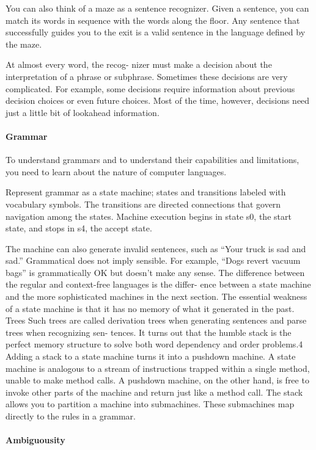 You can also think of a maze as a sentence recognizer. Given a sentence, you can match its words in sequence with the words along the floor. Any sentence that successfully guides you to the exit is a valid sentence in the language defined by the maze. 

At almost every word, the recog- nizer must make a decision about the interpretation of a phrase or subphrase. Sometimes these decisions are very complicated. For example, some decisions require information about previous decision choices or even future choices. Most of the time, however, decisions need just a little bit of lookahead information.

\paragraph{Grammar} To understand grammars and to understand their capabilities and limitations, you need to learn about the nature of computer languages.

Represent grammar as a state machine; states and transitions labeled with vocabulary symbols. The transitions are directed connections that govern navigation among the states. Machine execution begins in state s0, the start state, and stops in s4, the accept state.

The machine can also generate invalid sentences, such as “Your truck is sad and sad.” Grammatical does not imply sensible. For example, “Dogs revert vacuum bags” is grammatically OK but doesn’t make any sense. 
The difference between the regular and context-free languages is the differ- ence between a state machine and the more sophisticated machines in the next section. The essential weakness of a state machine is that it has no memory of what it generated in the past. 
Trees Such trees are called derivation trees when generating sentences and parse trees when recognizing sen- tences.
It turns out that the humble stack is the perfect memory structure to solve both word dependency and order problems.4 Adding a stack to a state machine turns it into a pushdown machine. A state machine is analogous to a stream of instructions trapped within a single method, unable to make method calls. A pushdown machine, on the other hand, is free to invoke other parts of the machine and return just like a method call. The stack allows you to partition a machine into submachines. These submachines map directly to the rules in a grammar.

\paragraph{Ambiguousity}


